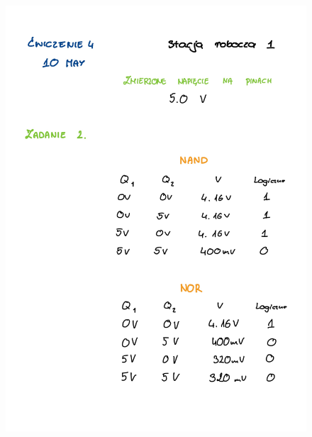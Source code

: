 \documentclass[14pt, table]{extarticle}
\begin{document}
\begin{figure}[H]
\includegraphics[scale=0.2]{B0}
\centering
\captionsetup{labelformat=empty}
\caption{}
\end{figure}
\end{document}
